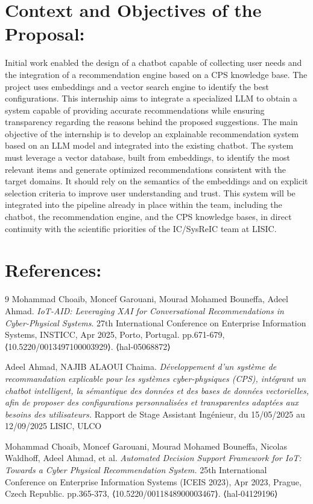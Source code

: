 \documentclass{article}
\begin{document}
\section{Context and Objectives of the Proposal:}
Initial work \cite{choaib2025iot, choaib2023automated} enabled the design of a chatbot capable of collecting user needs and the integration of a recommendation engine based on a CPS knowledge base. The project uses embeddings and a vector search engine to identify the best configurations. This internship aims to integrate a specialized LLM to obtain a system capable of providing accurate recommendations while ensuring transparency regarding the reasons behind the proposed suggestions. The main objective of the internship is to develop an explainable recommendation system based on an LLM model and integrated into the existing chatbot. The system must leverage a vector database, built from embeddings, to identify the most relevant items and generate optimized recommendations consistent with the target domains. It should rely on the semantics of the embeddings and on explicit selection criteria to improve user understanding and trust. This system will be integrated into the pipeline already in place within the team, including the chatbot, the recommendation engine, and the CPS knowledge bases, in direct continuity with the scientific priorities of the IC/SysReIC team at LISIC.

\section{References: }

\begin{thebibliography}{9}
Mohammad Choaib, Moncef Garouani, Mourad Mohamed Bouneffa, Adeel Ahmad. 
\textit{IoT-AID: Leveraging XAI for Conversational Recommendations in Cyber-Physical Systems}. 
27th International Conference on Enterprise Information Systems, INSTICC, Apr 2025, Porto, Portugal. 
pp.671-679, ⟨10.5220/0013497100003929⟩. ⟨hal-05068872⟩

Adeel Ahmad, NAJIB ALAOUI Chaima.
\textit{Développement d'un système de recommandation explicable pour les systèmes cyber-physiques (CPS), intégrant un chatbot intelligent, la sémantique des données et des bases de données vectorielles, afin de proposer des configurations personnalisées et transparentes adaptées aux besoins des utilisateurs.}
Rapport de Stage Assistant Ingénieur, du 15/05/2025 au 12/09/2025 LISIC, ULCO

Mohammad Choaib, Moncef Garouani, Mourad Mohamed Bouneffa, Nicolas Waldhoff, Adeel Ahmad, et al.
\textit{Automated Decision Support Framework for IoT: Towards a Cyber Physical Recommendation System.}
25th International Conference on Enterprise Information Systems (ICEIS 2023), Apr 2023, Prague, Czech Republic.
pp.365-373, ⟨10.5220/0011848900003467⟩. ⟨hal-04129196⟩
\end{thebibliography}
\end{document}
